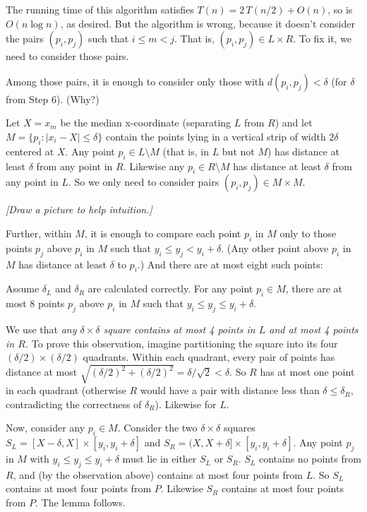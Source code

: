 The running time of this algorithm satisfies
$T(n) = 2\,T(n/2) + O(n)$, so is $O(n\log n)$, as desired.
But the algorithm is wrong,
because it doesn't consider the pairs $(p_i, p_j)$ such that $i\le m < j$.
That is, $(p_i, p_j)\in L\times R$.
To fix it, we need to consider those pairs.

Among those pairs, it is enough to consider
only those with $d(p_i, p_j) < \delta$ (for $\delta$ from Step 6).
(Why?)

Let $X=x_m$ be the median x-coordinate (separating $L$ from $R$)
and let $M=\{p_i : |x_i - X| \le \delta\}$
contain the points lying in a vertical strip of width $2\delta$
centered at $X$.
Any point $p_i\in L \setminus M$ (that is, in $L$ but not $M$)
has distance at least $\delta$ from any point in $R$.
Likewise any $p_i\in R \setminus M$
has distance at least $\delta$ from any point in $L$.
So we only need to consider pairs $(p_i, p_j)\in M \times M$.

\emph{[Draw a picture to help intuition.]}

Further, within $M$,
it is enough to compare each point $p_i$ in $M$
only to those points $p_j$ above $p_i$ in $M$
such that $y_i \le y_j < y_i + \delta$.
(Any other point above $p_i$ in $M$
has distance at least $\delta$ to $p_i$.)
And there are at most eight such points:

\begin{lemma}\label{dc: at most 8}
  Assume $\delta_L$ and $\delta_R$ are calculated correctly.
  For any point $p_i\in M$,
  there are at most 8 points $p_j$ above $p_i$ in $M$
  such that $y_i \le y_j \le y_i + \delta$.
\end{lemma}
\begin{shortFormProof}
  We use that
  \emph{any $\delta\times\delta$ square contains at most 4 points in $L$
    and at most 4 points in $R$.}
  To prove this observation, imagine partitioning the square into its four
  $(\delta/2)\times(\delta/2)$ quadrants.
  Within each quadrant, every pair of points
  has distance at most $\sqrt{(\delta/2)^2 + (\delta/2)^2} = \delta/\sqrt 2 < \delta$.
  So $R$ has at most one point in each quadrant
  (otherwise $R$ would have a pair with distance less than $\delta \le \delta_R$,
  contradicting the correctness of $\delta_R$).
  Likewise for $L$.

  Now, consider any $p_i\in M$.
  Consider the two $\delta\times\delta$ squares
  $S_L = [X-\delta, X] \times [y_i, y_i+\delta]$
  and $S_R = (X, X+\delta]\times [y_i, y_i+\delta]$.
  Any point $p_j$ in $M$
  with $y_i \le y_j\le y_i+\delta$
  must lie in either $S_L$ or $S_R$.
  $S_L$ contains no points from $R$,
  and (by the observation above) contains at most four points from $L$.
  So $S_L$ contains at most four points from $P$.
  Likewise $S_R$ contains at most four points from $P$.
  The lemma follows.
\end{shortFormProof}

